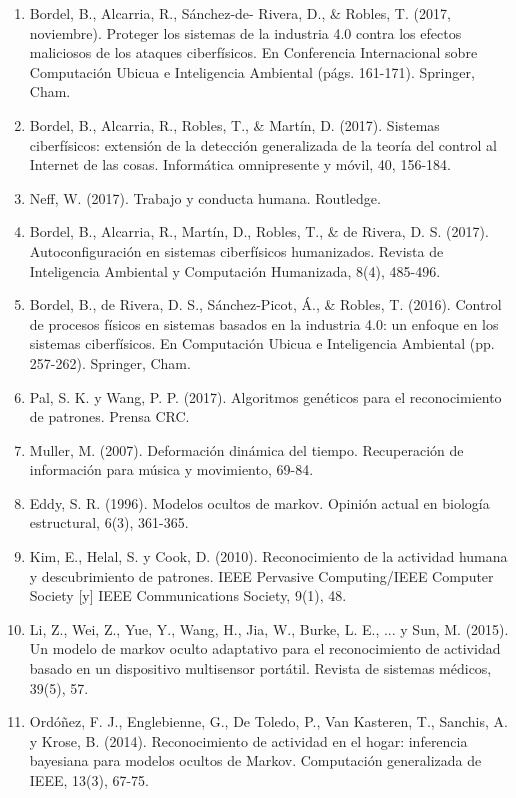 \documentclass[10pt]{article}
\begin{document}
\begin{enumerate}
	\item	Bordel, B., Alcarria, R., Sánchez-de-  Rivera, D., & Robles, T. (2017, noviembre). Proteger los sistemas de la industria 4.0 contra los efectos maliciosos de los ataques ciberfísicos. En Conferencia Internacional sobre Computación Ubicua e Inteligencia Ambiental (págs. 161-171). Springer, Cham.
	\item Bordel, B., Alcarria, R., Robles, T., & Martín, D. (2017). Sistemas ciberfísicos: extensión de la detección generalizada de la teoría del control al Internet de las cosas. Informática omnipresente y móvil, 40, 156-184.
	\item	Neff, W. (2017). Trabajo y conducta humana. Routledge.
	\item	Bordel, B., Alcarria, R., Martín, D., Robles, T., & de Rivera, D. S. (2017). Autoconfiguración en sistemas ciberfísicos humanizados. Revista de Inteligencia Ambiental y Computación Humanizada, 8(4), 485-496.
	\item	Bordel, B., de Rivera, D. S., Sánchez-Picot, Á., & Robles, T. (2016). Control de procesos físicos en sistemas basados en la industria 4.0: un enfoque en los sistemas ciberfísicos. En Computación Ubicua e Inteligencia Ambiental (pp. 257-262). Springer, Cham.
	\item	Pal, S. K. y Wang, P. P. (2017). Algoritmos genéticos para el reconocimiento de patrones. Prensa CRC.
	\item	Muller, M. (2007). Deformación dinámica del tiempo. Recuperación de información para música y movimiento, 69-84.
	\item	Eddy, S. R. (1996). Modelos ocultos de markov. Opinión actual en biología estructural, 6(3), 361-365.
	\item	Kim, E., Helal, S. y Cook, D. (2010). Reconocimiento de la actividad humana y descubrimiento de patrones. IEEE Pervasive Computing/IEEE Computer Society [y] IEEE Communications Society, 9(1), 48.
	\item	Li, Z., Wei, Z., Yue, Y., Wang, H., Jia, W., Burke, L. E., ... y Sun, M. (2015). Un modelo de markov oculto adaptativo para el reconocimiento de actividad basado en un dispositivo multisensor portátil. Revista de sistemas médicos, 39(5), 57.
	\item	Ordóñez, F. J., Englebienne, G., De Toledo, P., Van Kasteren, T., Sanchis, A. y Krose, B. (2014). Reconocimiento de actividad en el hogar: inferencia bayesiana para modelos ocultos de Markov. Computación generalizada de IEEE, 13(3), 67-75.

\end{enumerate}
\end{document}
